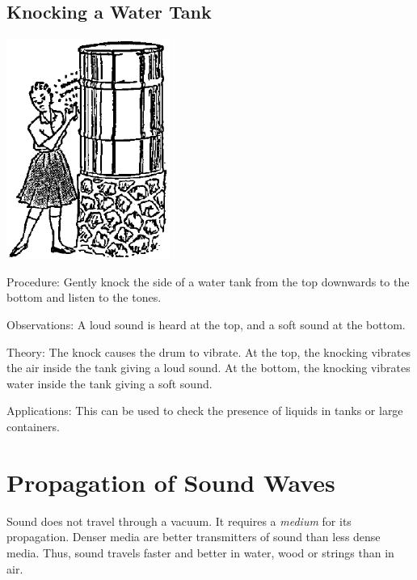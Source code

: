 \begin{multicols}{2}
\subsection{Knocking a Water Tank}

\begin{center}
\includegraphics[width=0.4\textwidth]{./img/source/knocking-water-tank.png}
\end{center}

\begin{description*}
\item[Procedure:]{Gently knock the side of a water tank from the top downwards to the bottom and listen to the tones.}
\item[Observations:]{A loud sound is heard at the top, and a soft sound at the bottom.}
\item[Theory:]{The knock causes the drum to vibrate. At the top, the knocking vibrates the air inside the tank giving a loud sound. At the bottom, the knocking vibrates water inside the tank giving a soft sound.}
\item[Applications:]{This can be used to check the presence of liquids in tanks or large containers.}
\end{description*}


\section*{Propagation of Sound Waves}
Sound does not travel through a vacuum. It requires a \emph{medium} for its propagation. Denser media are better transmitters of sound than less dense media. Thus, sound travels faster and better in water, wood or strings than in air.



\end{multicols}
